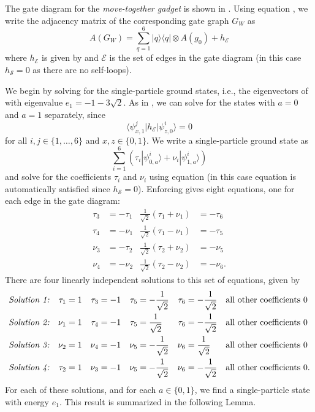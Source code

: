 \documentclass[../thesis-main/thesis-main]{subfiles}
\begin{document}
The gate diagram for the \emph{move-together gadget} is shown in . Using equation , we write the adjacency matrix of the corresponding gate graph $G_W$ as 
\begin{equation}
A(G_W)=\sum_{q=1}^{6}|q\rangle\langle q|\otimes A(g_{0})+h_{\mathcal{E}}\label{eq:move_together_adj}
\end{equation}
where $h_{\mathcal{E}}$ is given by  and $\mathcal{E}$ is the set of edges in the gate diagram (in this case $h_{\mathcal{S}}=0$ as there are no self-loops).

We begin by solving for the single-particle ground states, i.e., the eigenvectors of  with eigenvalue $e_{1}=-1-3\sqrt{2}$. As in , we can solve for the states with $a=0$ and $a=1$ separately, since
\[
\langle\psi_{x,1}^{j}|h_{\mathcal{E}}|\psi_{z,0}^{i}\rangle=0
\]
for all $i,j\in\{1,\ldots,6\}$ and $x,z\in\{0,1\}$. We write a single-particle ground state as
\[
\sum_{i=1}^{6}\left(\tau_{i}|\psi_{0,a}^{i}\rangle+\nu_{i}|\psi_{1,a}^{i}\rangle\right)
\]
and solve for the coefficients $\tau_{i}$ and $\nu_{i}$ using equation  (in this case equation  is automatically satisfied since $h_{\mathcal{S}}=0$). Enforcing  gives eight equations, one for each edge in the gate diagram:
\begin{align*}
  \tau_{3}&=-\tau_{1} & 
  \frac{1}{\sqrt{2}}(\tau_{1}+\nu_{1})&=-\tau_{6} \\
  \tau_{4}&=-\nu_{1} & 
  \frac{1}{\sqrt{2}}(\tau_{1}-\nu_{1})&=-\tau_{5}\\
  \nu_{3}&=-\tau_{2} & 
  \frac{1}{\sqrt{2}}(\tau_{2}+\nu_{2})&=-\nu_{5}\\
  \nu_{4}&=-\nu_{2} & 
  \frac{1}{\sqrt{2}}(\tau_{2}-\nu_{2})&=-\nu_{6}.
\end{align*}
There are four linearly independent solutions to this set of equations, given by 
\begin{align*}
  \text{\emph{Solution 1:}} && 
    \tau_{1} &= 1 & \tau_{3} &=-1 & 
    \tau_{5} &= -\frac{1}{\sqrt{2}} & \tau_{6} &= -\frac{1}{\sqrt{2}} &&
    \text{all other coefficients }0 \\
  \text{\emph{Solution 2:}} && 
    \nu_{1} &= 1 & \tau_{4} &= -1 &
    \tau_{5} &= \frac{1}{\sqrt{2}} & \tau_{6} &= -\frac{1}{\sqrt{2}} &&
    \text{all other coefficients }0 \\
  \text{\emph{Solution 3:}} && 
    \nu_{2} &= 1 & \nu_{4} &= -1 &
    \nu_{5} &= -\frac{1}{\sqrt{2}} & \nu_{6} &= \frac{1}{\sqrt{2}} &&
    \text{all other coefficients }0 \\
  \text{\emph{Solution 4:}} && 
    \tau_{2} &= 1 & \nu_{3} &= -1 &
    \nu_{5} &= -\frac{1}{\sqrt{2}} & \nu_{6} &= -\frac{1}{\sqrt{2}} &&
    \text{all other coefficients }0.
\end{align*}
For each of these solutions, and for each $a\in\{0,1\}$, we find a single-particle state with energy $e_1$. This result is summarized in the following Lemma.
\end{document}
